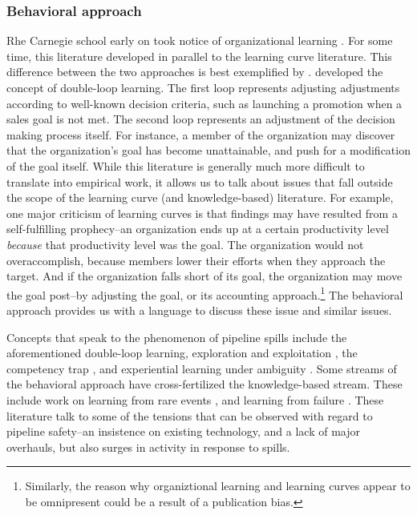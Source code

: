 

\subsubsection{Behavioral approach}

Rhe Carnegie school early on took notice of organizational learning \citep[e.g., ][]{March1963}. For some time, this literature developed in parallel to the learning curve literature. This difference between the two approaches is best exemplified by \citet{Argyris1978}. \citet{Argyris1978} developed the concept of double-loop learning. The first loop represents adjusting adjustments according to well-known decision criteria, such as launching a promotion when a sales goal is not met. The second loop represents an adjustment of the decision making process itself. For instance, a member of the organization may discover that the organization's goal has become unattainable, and push for a modification of the goal itself. While this literature is generally much more difficult to translate into empirical work, it allows us to talk about issues that fall outside the scope of the learning curve (and knowledge-based) literature. For example, one major criticism of learning curves is that findings may have resulted from a self-fulfilling prophecy--an organization ends up at a certain productivity level \textit{because} that productivity level was the goal. The organization would not overaccomplish, because members lower their efforts when they approach the target. And if the organization falls short of its goal, the organization may move the goal post--by adjusting the goal, or its accounting approach.\footnote{Similarly, the reason why organiztional learning and learning curves appear to be omnipresent could be a result of a publication bias.} The behavioral approach provides us with a language to discuss these issue and similar issues. 

Concepts that speak to the phenomenon of pipeline spills include the aforementioned double-loop learning, exploration and exploitation \citep{March1991}, the competency trap \citep{Levitt1988}, and experiential learning under ambiguity \citep{March1975}. Some streams of the behavioral approach have cross-fertilized the knowledge-based stream. These include work on learning from rare events \citep{March1991b, Maslach2018}, and learning from failure \citep[e.g.,][]{Madsen2010}. These literature talk to some of the tensions that can be observed with regard to pipeline safety--an insistence on existing technology, and a lack of major overhauls, but also surges in activity in response to spills.



